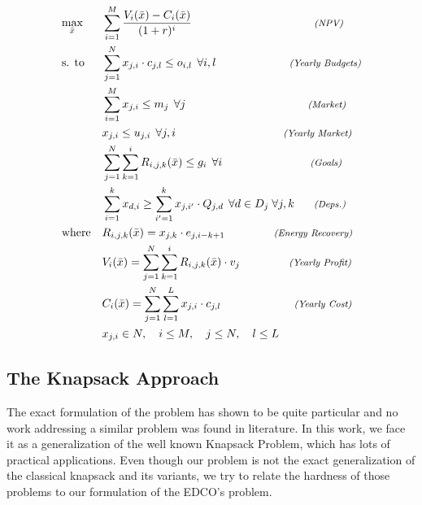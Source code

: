     \begin{equation}
    \label{eq:pmmlpo++}
      \begin{aligned}
	 & \underset{\bar{x}}{\text{max}}  & & \sum_{i=1}^{M} \frac{V_i(\bar{x}) - C_i(\bar{x})}{(1 + r)^i}	\hspace{25ex} \textit{\scriptsize (NPV)} \\
	 & \text{s. to} 			& & \sum_{j=1}^{N} x_{j, i} \cdot c_{j,l} \le o_{i,l} \, \; \forall i, l \hspace{15ex} \textit{\scriptsize (Yearly Budgets)} \\
	 & 					& & \sum_{i=1}^{M} x_{j, i} \le m_j \, \; \forall j 			\hspace{25ex} \textit{\scriptsize (Market)} \\
	 & 					& & x_{j, i} \le u_{j, i} \, \; \forall j, i 			\hspace{22ex} \textit{\scriptsize (Yearly Market)} \\
	 & 					& & \sum_{j=1}^{N} \sum_{k=1}^{i}R_{i,j,k}(\bar{x}) \leq g_i \, \; \forall i    \hspace{18ex}  \textit{\scriptsize (Goals)} \\
	 & 					& & \sum_{i=1}^{k} x_{d, i} \ge \sum_{i'=1}^{k} x_{j, i'} \cdot Q_{j, d} \, \; \forall d \in D_j\;  \forall j,k  \hspace{4ex} \textit{\scriptsize (Deps.)}\\
	 & \text{where}				& &  R_{i,j,k}(\bar{x}) = x_{j, k} \cdot e_{j, i - k + 1} 	\hspace{10ex}  \textit{\scriptsize (Energy Recovery)}\\
	 & 					& & V_{i}(\bar{x}) = \sum_{j=1}^{N} \sum_{k=1}^{i} R_{i, j, k}(\bar{x}) \cdot v_j   \hspace{10ex}  \textit{\scriptsize (Yearly Profit)}\\
	 & 					& & C_{i}(\bar{x}) = \sum_{j=1}^{N} \sum_{l=1}^{L} x_{j, i} \cdot c_{j,l}   \hspace{15ex} \textit{\scriptsize (Yearly Cost)}\\
	 & 					& & x_{j,i} \in N, \quad i \le M, \quad j \le N, \quad l \le L
      \end{aligned}
    \end{equation}

\subsection{The Knapsack Approach}
\label{sec:model:knap}

The exact formulation of the problem has shown to be quite particular and no work addressing 
a similar problem was found in literature. In this work, we face it as a generalization
of the well known Knapsack Problem, which has lots of practical applications. 
Even though our problem is not the exact generalization of the classical knapsack
and its variants, we try to relate the hardness of those problems to our formulation of the
EDCO's problem.


